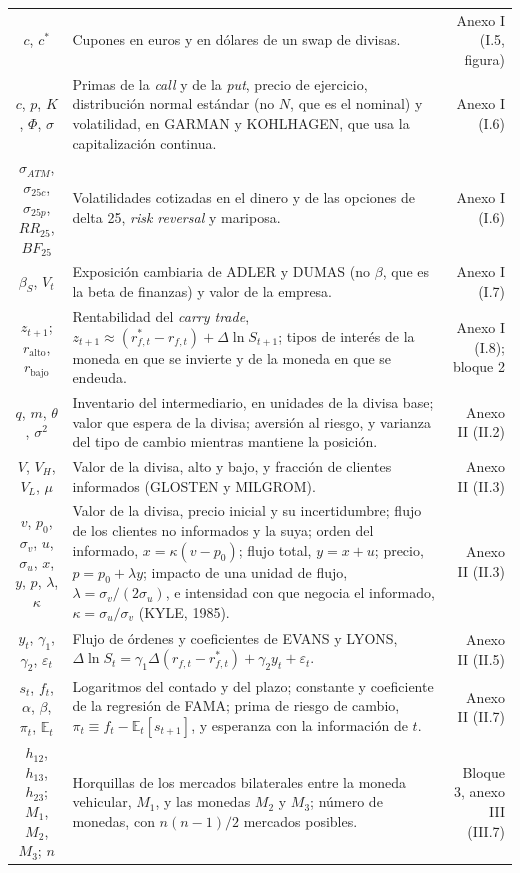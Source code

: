 \documentclass[10pt,a4paper]{article}
\begin{document}
\begin{longtable}{SMD}
$c$, $c^*$ & Cupones en euros y en dólares de un swap de divisas. & Anexo I (I.5, figura)\\
$c$, $p$, $K$, $\Phi$, $\sigma$ & Primas de la \textit{call} y de la \textit{put}, precio de ejercicio, distribución normal estándar (no $N$, que es el nominal) y volatilidad, en GARMAN y KOHLHAGEN, que usa la capitalización continua. & Anexo I (I.6)\\
$\sigma_{ATM}$, $\sigma_{25c}$, $\sigma_{25p}$, $RR_{25}$, $BF_{25}$ & Volatilidades cotizadas en el dinero y de las opciones de delta 25, \textit{risk reversal} y mariposa. & Anexo I (I.6)\\
$\beta_S$, $V_t$ & Exposición cambiaria de ADLER y DUMAS (no $\beta$, que es la beta de finanzas) y valor de la empresa. & Anexo I (I.7)\\
$z_{t+1}$; $r_{\mathrm{alto}}$, $r_{\mathrm{bajo}}$ & Rentabilidad del \textit{carry trade}, $z_{t+1}\approx(r_{f,t}^*-r_{f,t})+\Delta\ln S_{t+1}$; tipos de interés de la moneda en que se invierte y de la moneda en que se endeuda. & Anexo I (I.8); bloque 2\\
$q$, $m$, $\theta$, $\sigma^2$ & Inventario del intermediario, en unidades de la divisa base; valor que espera de la divisa; aversión al riesgo, y varianza del tipo de cambio mientras mantiene la posición. & Anexo II (II.2)\\
$V$, $V_H$, $V_L$, $\mu$ & Valor de la divisa, alto y bajo, y fracción de clientes informados (GLOSTEN y MILGROM). & Anexo II (II.3)\\
$v$, $p_0$, $\sigma_v$, $u$, $\sigma_u$, $x$, $y$, $p$, $\lambda$, $\kappa$ & Valor de la divisa, precio inicial y su incertidumbre; flujo de los clientes no informados y la suya; orden del informado, $x=\kappa(v-p_0)$; flujo total, $y=x+u$; precio, $p=p_0+\lambda y$; impacto de una unidad de flujo, $\lambda=\sigma_v/(2\sigma_u)$, e intensidad con que negocia el informado, $\kappa=\sigma_u/\sigma_v$ (KYLE, 1985). & Anexo II (II.3)\\
$y_t$, $\gamma_1$, $\gamma_2$, $\varepsilon_t$ & Flujo de órdenes y coeficientes de EVANS y LYONS, $\Delta\ln S_t=\gamma_1\Delta(r_{f,t}-r_{f,t}^*)+\gamma_2y_t+\varepsilon_t$. & Anexo II (II.5)\\
$s_t$, $f_t$, $\alpha$, $\beta$, $\pi_t$, $\mathbb{E}_t$ & Logaritmos del contado y del plazo; constante y coeficiente de la regresión de FAMA; prima de riesgo de cambio, $\pi_t\equiv f_t-\mathbb{E}_t[s_{t+1}]$, y esperanza con la información de $t$. & Anexo II (II.7)\\
$h_{12}$, $h_{13}$, $h_{23}$; $M_1$, $M_2$, $M_3$; $n$ & Horquillas de los mercados bilaterales entre la moneda vehicular, $M_1$, y las monedas $M_2$ y $M_3$; número de monedas, con $n(n-1)/2$ mercados posibles. & Bloque 3, anexo III (III.7)\\
\end{longtable}
\end{document}
